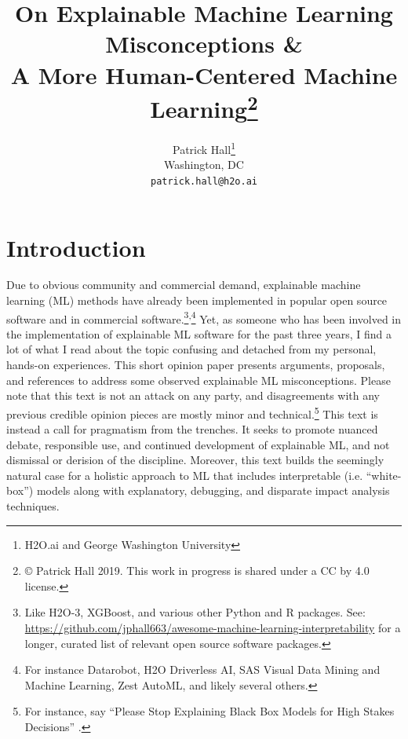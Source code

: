 \documentclass[fleqn]{article}
\title{On Explainable Machine Learning Misconceptions \&\\ A More Human-Centered Machine Learning\footnote{\copyright \hspace{1pt} Patrick Hall 2019. This work in progress is shared under a CC by 4.0 license.}}
\author{
  Patrick Hall\footnote{H2O.ai and George Washington University} \\
  Washington, DC\\
  \texttt{patrick.hall@h2o.ai}
}
\begin{document}
\maketitle

\section*{Introduction}

Due to obvious community and commercial demand, explainable machine learning (ML) methods have already been implemented in popular open source software and in commercial software.\footnote{Like H2O-3, XGBoost, and various other Python and R packages. See: \url{https://github.com/jphall663/awesome-machine-learning-interpretability} for a longer, curated list of relevant open source software packages.}\textsuperscript{,}\footnote{For instance  Datarobot, H2O Driverless AI, SAS Visual Data Mining and Machine Learning, Zest AutoML, and likely several others.} Yet, as someone who has been involved in the implementation of explainable ML software for the past three years, I find a lot of what I read about the topic confusing and detached from my personal, hands-on experiences. This short opinion paper presents arguments, proposals, and references to address some observed explainable ML misconceptions. Please note that this text is not an attack on any party, and disagreements with any previous credible opinion pieces are mostly minor and technical.\footnote{For instance, say ``Please Stop Explaining Black Box Models for High Stakes Decisions'' \cite{please_stop}.} This text is instead a call for pragmatism from the trenches. It seeks to promote nuanced debate, responsible use, and continued development of explainable ML, and not dismissal or derision of the discipline.  Moreover, this text builds the seemingly natural case for a holistic approach to ML that includes interpretable (i.e. ``white-box'') models along with explanatory, debugging, and disparate impact analysis techniques.\\
\end{document}
